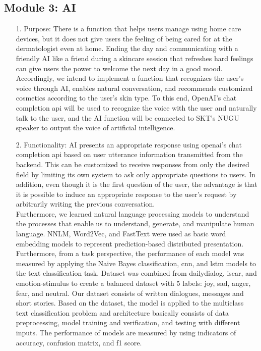 \documentclass[conference]{IEEEtran}
\begin{document}
\subsection{Module 3: AI}
\begin{itemize}
    \item [1.] Purpose: There is a function that helps users manage using home care devices, but it does not give users the feeling of being cared for at the dermatologist even at home. Ending the day and communicating with a friendly AI like a friend during a skincare session that refreshes hard feelings can give users the power to welcome the next day in a good mood. Accordingly, we intend to implement a function that recognizes the user's voice through AI, enables natural conversation, and recommends customized cosmetics according to the user's skin type. To this end, OpenAI's chat completion api will be used to recognize the voice with the user and naturally talk to the user, and the AI function will be connected to SKT's NUGU speaker to output the voice of artificial intelligence.
 \\ 
    \item[2.] Functionality: AI presents an appropriate response using openai's chat completion api based on user utterance information transmitted from the backend. This can be customized to receive responses from only the desired field by limiting its own system to ask only appropriate questions to users. In addition, even though it is the first question of the user, the advantage is that it is possible to induce an appropriate response to the user's request by arbitrarily writing the previous conversation.\\
    Furthermore, we learned natural language processing models to understand the processes that enable us to understand, generate, and manipulate human language. NNLM, Word2Vec, and FastText were used as basic word embedding models to represent prediction-based distributed presentation. Furthermore, from a task perspective, the performance of each model was measured by applying the Naive Bayes classification, cnn, and lstm models to the text classification task. Dataset was combined from dailydialog, isear, and emotion-stimulus to create a balanced dataset with 5 labels: joy, sad, anger, fear, and neutral. Our dataset consists of written dialogues, messages and short stories. Based on the dataset, the model is applied to the multiclass text classification problem and architecture basically consists of data preprocessing, model training and verification, and testing with different inputs. The performance of models are measured by using indicators of accuracy, confusion matrix, and f1 score.
\\
    

\end{itemize}
\end{document}
